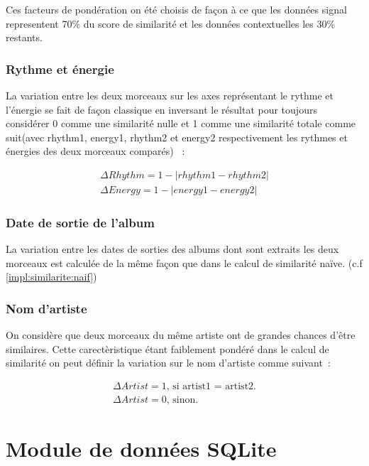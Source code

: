 Ces facteurs de pondération on été choisis de façon à ce que les données
signal representent 70\% du score de similarité et les données contextuelles
les 30\% restants.

\subsubsection{Rythme et énergie}
\label{impl:similarite:complet:rhythm}

La variation entre les deux morceaux sur les axes représentant le rythme et
l'énergie se fait de façon classique en inversant le résultat pour toujours
considérer 0 comme une similarité nulle et 1 comme une similarité totale comme
suit(avec rhythm1, energy1, rhythm2 et energy2 respectivement les rythmes et
énergies des deux morceaux comparés) ~:

\begin{align}
  \Delta Rhythm = 1 - |rhythm1 - rhythm2|\\
  \Delta Energy = 1 - |energy1 - energy2|
\end{align}

\subsubsection{Date de sortie de l'album}
\label{impl:similarite:complet:date}

La variation entre les dates de sorties des albums dont sont extraits les deux
morceaux est calculée de la même façon que dans le calcul de similarité naïve.
(c.f \ref{impl:similarite:naif})

\subsubsection{Nom d'artiste}
\label{impl:similarite:complet:name}

On considère que deux morceaux du même artiste ont de grandes chances d'être
similaires. Cette carectèristique étant faiblement pondéré dans le calcul de
similarité on peut définir la variation sur le nom d'artiste comme suivant~:

\begin{align}
  \Delta Artist = \text{1, si artist1 = artist2.}\\
  \Delta Artist = \text{0, sinon.}
\end{align}

\section{Module de données SQLite}
\label{implementation:sqlite}

